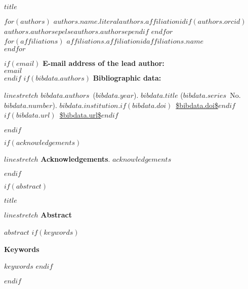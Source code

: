 
\begin{titlepage}
\thispagestyle{titlepage}

\begin{center}
\vspace{72pt}
\begin{doublespace}
\fontsize{18pt}{0}
\textbf{$title$}\\
\end{doublespace}
\vspace{30pt}
\textit{
    \fontsize{14pt}{0}\selectfont
    $for(authors)$
    $authors.name.literal$$authors.affiliationid$$if(authors.orcid)$\ $authors.authorsep$$else$$authors.authorsep$$endif$
    $endfor$
}
\\ \vspace{12pt}
\textit{
    \fontsize{14pt}{0}\selectfont
    $for(affiliations)$
    $affiliations.affiliationid$$affiliations.name$\\ \vspace{5pt}
    $endfor$
}
\vspace{36pt}
\end{center}
\vspace{48pt}
\begin{flushleft}
$if(email)$
\textbf{E-mail address of the lead author:}\\
\vspace{6pt}
$email$ \\
\vspace{12pt}
$endif$
$if(bibdata.authors)$
\textbf{Bibliographic data:}\\
\vspace{6pt} %
\begin{spacing}{$linestretch$}
$bibdata.authors$~($bibdata.year$). \textit{$bibdata.title$} ($bibdata.series$\ No.~$bibdata.number$). $bibdata.institution$.$if(bibdata.doi)$\ \url{$bibdata.doi$}$endif$$if(bibdata.url)$\ \url{$bibdata.url$}$endif$
\end{spacing}
$endif$
\end{flushleft}

\vfill

$if(acknowledgements)$
\begin{spacing}{$linestretch$}
\textbf{Acknowledgements}.
$acknowledgements$
\end{spacing}
$endif$
\end{titlepage}


$if(abstract)$
\newpage
\pagestyle{scrheadings}
\begin{doublespace}
\fontsize{18pt}{0}
\textbf{$title$}\\
\end{doublespace}

\begin{spacing}{$linestretch$}
\textbf{Abstract}

$abstract$
$if(keywords)$

\textbf{Keywords}

$keywords$
$endif$
\end{spacing}
$endif$

\newpage

